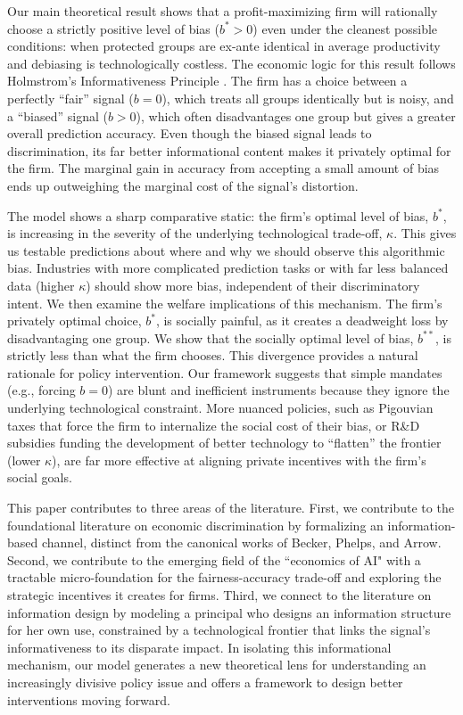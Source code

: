 Our main theoretical result shows that a profit-maximizing firm will rationally choose a strictly positive level of bias ($b^* > 0$) even under the cleanest possible conditions: when protected groups are ex-ante identical in average productivity and debiasing is technologically costless. The economic logic for this result follows Holmstrom's Informativeness Principle \citep{Holmstrom1979}. The firm has a choice between a perfectly ``fair'' signal ($b=0$), which treats all groups identically but is noisy, and a ``biased'' signal ($b>0$), which often disadvantages one group but gives a greater overall prediction accuracy. Even though the biased signal leads to discrimination, its far better informational content makes it privately optimal for the firm. The marginal gain in accuracy from accepting a small amount of bias ends up outweighing the marginal cost of the signal's distortion.

The model shows a sharp comparative static: the firm's optimal level of bias, $b^*$, is increasing in the severity of the underlying technological trade-off, $\kappa$. This gives us testable predictions about where and why we should observe this algorithmic bias. Industries with more complicated prediction tasks or with far less balanced data (higher $\kappa$) should show more bias, independent of their discriminatory intent. We then examine the welfare implications of this mechanism. The firm's privately optimal choice, $b^*$, is socially painful, as it creates a deadweight loss by disadvantaging one group. We show that the socially optimal level of bias, $b^{**}$, is strictly less than what the firm chooses. This divergence provides a natural rationale for policy intervention. Our framework suggests that simple mandates (e.g., forcing $b=0$) are blunt and inefficient instruments because they ignore the underlying technological constraint. More nuanced policies, such as Pigouvian taxes that force the firm to internalize the social cost of their bias, or R\&D subsidies funding the development of better technology to ``flatten'' the frontier (lower $\kappa$), are far more effective at aligning private incentives with the firm's social goals.

This paper contributes to three areas of the literature. First, we contribute to the foundational literature on economic discrimination by formalizing an information-based channel, distinct from the canonical works of Becker, Phelps, and Arrow. Second, we contribute to the emerging field of the ``economics of AI" with a tractable micro-foundation for the fairness-accuracy trade-off and exploring the strategic incentives it creates for firms. Third, we connect to the literature on information design \citep{Kamenica2011, Bergemann2019} by modeling a principal who designs an information structure for her own use, constrained by a technological frontier that links the signal's informativeness to its disparate impact. In isolating this informational mechanism, our model generates a new theoretical lens for understanding an increasingly divisive policy issue and offers a framework to design better interventions moving forward.
